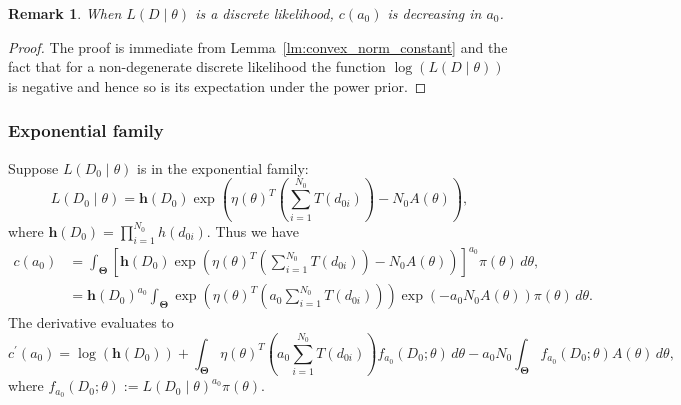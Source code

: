 \documentclass[a4paper, notitlepage, 11pt]{article}
\newtheorem{remark}{Remark}[]
\begin{document}
\begin{remark}
 \label{rmk:discrete_decreasing}
 When $L(D \mid \theta)$ is a discrete likelihood, $c(a_0)$ is  decreasing in $a_0$.
\end{remark}
\begin{proof}
 The proof is immediate from Lemma~\ref{lm:convex_norm_constant} and the fact that for a non-degenerate discrete likelihood the function $\log(L(D\mid\theta))$ is negative and hence so is its expectation under the power prior.
\end{proof}

\subsubsection{Exponential family}
\label{sec:expo_family}

Suppose $L(D_0 \mid \theta)$ is in the exponential family:
\begin{equation}
 L(D_0 \mid \theta) = \boldsymbol h(D_0) \exp \left( \eta(\theta)^T \left(\sum_{i=1}^{N_0} T(d_{0i}) \right) - N_0 A(\theta) \right),
\end{equation}
where $\boldsymbol h(D_0) = \prod_{i = 1}^{N_0} h(d_{0i})$.
Thus we have
\begin{align}
 c(a_0) &=  \int_{\boldsymbol\Theta} \left[ \boldsymbol h(D_0) \exp \left( \eta(\theta)^T \left(\sum_{i=1}^{N_0} T(d_{0i}) \right) - N_0 A(\theta) \right) \right]^{a_0}\pi(\theta) \, d\theta, \\
  \label{eq:expo_family_const}
 &= \boldsymbol h(D_0)^{a_0}\int_{\boldsymbol\Theta} \exp \left( \eta(\theta)^T \left(a_0 \sum_{i=1}^{N_0} T(d_{0i}) \right) \right) \exp\left(- a_0N_0 A(\theta) \right) \pi(\theta) \, d\theta.
\end{align}
The derivative evaluates to 
\begin{equation}
\label{eq:expo_family_deriv_general}
 c^\prime(a_0) = \log(\boldsymbol h(D_0)) + \int_{\boldsymbol\Theta} \eta(\theta)^T \left(a_0 \sum_{i=1}^{N_0} T(d_{0i}) \right) f_{a_0}(D_0; \theta) \, d\theta -  a_0N_0\int_{\boldsymbol\Theta} f_{a_0}(D_0; \theta)  A(\theta) \, d\theta,
\end{equation}
where $f_{a_0}(D_0; \theta) := L(D_0 \mid \theta)^{a_0}\pi(\theta)$.
\end{document}
